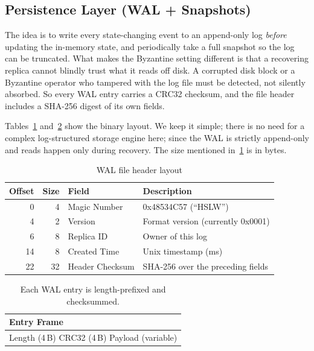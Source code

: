 \documentclass{SVProc}
\begin{document}
\subsection{Persistence Layer (WAL + Snapshots)}
\label{sec:persistence}

The idea is to write every state-changing event to an append-only log \emph{before} updating the in-memory state, and periodically take a full snapshot so the log can be truncated.  What makes the Byzantine setting different is that a
recovering replica cannot blindly trust what it reads off disk.  A corrupted disk block or a Byzantine operator who tampered with the log file must be detected, not silently absorbed. So every WAL entry carries a CRC32 checksum, and the file header includes a SHA-256 digest of its own fields.

Tables~\ref{tab:wal-header} and~\ref{tab:wal-entry} show the binary layout. We keep it simple; there is no need for a complex log-structured storage engine here; since the WAL is strictly append-only and reads happen only during recovery. The size mentioned in~\ref{tab:wal-header} is in bytes.

\begin{table}[t]
\centering
\setlength{\tabcolsep}{3pt}
\renewcommand{\arraystretch}{1.05}
\begin{tabular}{r r l p{4.5cm}}
\hline
\textbf{Offset} & \textbf{Size} & \textbf{Field} & \textbf{Description} \\
\hline
0  & 4  & Magic Number    & 0x48534C57 (``HSLW'') \\
4  & 2  & Version         & Format version (currently 0x0001) \\
6  & 8  & Replica ID      & Owner of this log \\
14 & 8  & Created Time    & Unix timestamp (ms) \\
22 & 32 & Header Checksum & SHA-256 over the preceding fields \\
\hline
\end{tabular}
\caption{WAL file header layout}
\label{tab:wal-header}
\end{table}

\begin{table}[t]
\centering
\setlength{\tabcolsep}{4pt}
\renewcommand{\arraystretch}{1.1}
\begin{tabular}{|p{8cm}|}
\hline
\centering \textbf{Entry Frame} \\
\hline
Length (4\,B) \quad CRC32 (4\,B) \quad Payload (variable) \\
\hline
\end{tabular}
\newline
\caption{Each WAL entry is length-prefixed and checksummed.}
\label{tab:wal-entry}
\end{table}
\end{document}
